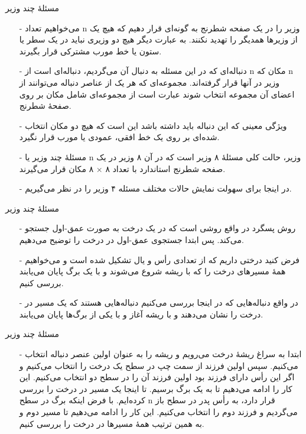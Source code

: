 
\begin{frame}{مسئلهٔ چند وزیر}
\begin{itemize}\itemr
\item[-]
می‌خواهیم تعداد n وزیر را در یک صفحه شطرنج
به گونه‌ای قرار دهیم که هیچ یک از وزیرها همدیگر را تهدید نکنند. به عبارت دیگر هیچ دو وزیری نباید در یک سطر یا ستون یا خط مورب مشترکی قرار بگیرند.
\item[-]
دنباله‌ای که در این مسئله به دنبال آن می‌گردیم، دنباله‌ای است از n مکان که n وزیر در آنها قرار گرفته‌اند. مجموعه‌ای که هر یک از عناصر دنباله می‌توانند از  اعضای آن مجموعه انتخاب شوند عبارت است از مجموعه‌ای شامل
مکان بر روی صفحهٔ شطرنج.
\item[-]
ویژگی معینی که این دنباله باید داشته باشد این است که هیچ دو مکان انتخاب شده‌ای بر روی یک خط افقی، عمودی یا مورب قرار نگیرد.
\item[-]
مسئلهٔ چند وزیر یا
n
وزیر،
 حالت کلی مسئلهٔ ۸ وزیر است که در آن ۸ وزیر در یک صفحه شطرنج استاندارد با تعداد
۸ $\times$ ۸
مکان قرار می‌گیرند.
\item[-]
در اینجا برای سهولت نمایش حالات مختلف مسئله ۴ وزیر را در نظر می‌گیریم.
\end{itemize}
\end{frame}


\begin{frame}{مسئلهٔ چند وزیر}
\begin{itemize}\itemr
\item[-]
روش پسگرد در واقع روشی است که در یک درخت
به صورت عمق-اول
جستجو می‌کند. پس ابتدا جستجوی عمق-اول در درخت را توضیح می‌دهیم.
\item[-]
فرض کنید درختی داریم که از تعدادی رأس و یال تشکیل شده است و می‌خواهیم همهٔ مسیرهای درخت را که با ریشه شروع می‌شوند و با یک برگ پایان می‌یابند بررسی کنیم.
\item[-]
در واقع دنباله‌هایی که در اینجا بررسی می‌کنیم دنباله‌هایی هستند که یک مسیر در درخت را نشان می‌دهند و با ریشه آغاز و با یکی از برگ‌ها پایان می‌یابند.
\end{itemize}
\end{frame}


\begin{frame}{مسئلهٔ چند وزیر}
\begin{itemize}\itemr
\item[-]
ابتدا به سراغ ریشهٔ درخت می‌رویم و ریشه را به عنوان اولین عنصر دنباله انتخاب می‌کنیم. سپس اولین فرزند از سمت چپ در سطح یک درخت را انتخاب می‌کنیم و اگر این رأس دارای فرزند بود اولین فرزند آن را در سطح دو انتخاب می‌کنیم. این کار را ادامه می‌دهیم تا به یک برگ برسیم. تا اینجا یک مسیر در درخت را بررسی کرده‌ایم. با فرض اینکه برگ در سطح n قرار دارد، به رأس پدر در سطح
باز می‌گردیم و فرزند دوم را انتخاب می‌کنیم. این کار را ادامه می‌دهیم تا مسیر دوم و به همین ترتیب همهٔ مسیرها در درخت را بررسی کنیم.
\end{itemize}
\end{frame}


